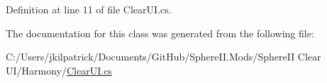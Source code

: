 Definition at line 11 of file Clear\+U\+I.\+cs.



The documentation for this class was generated from the following file\+:\begin{DoxyCompactItemize}
\item 
C\+:/\+Users/jkilpatrick/\+Documents/\+Git\+Hub/\+Sphere\+I\+I.\+Mods/\+Sphere\+I\+I Clear U\+I/\+Harmony/\mbox{\hyperlink{_clear_u_i_8cs}{Clear\+U\+I.\+cs}}\end{DoxyCompactItemize}
